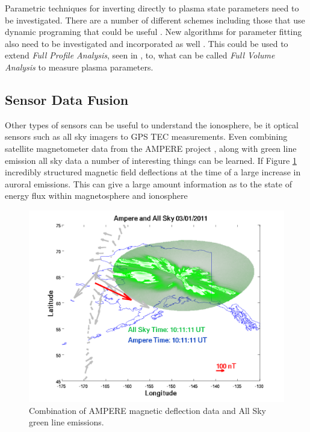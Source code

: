 Parametric techniques for inverting directly to plasma state parameters need to be investigated. There are a number of different schemes including those that use dynamic programing that could be useful \citep{Yau:1992kd,Yau:1993kf,Oktem:2014ju}. New algorithms for parameter fitting also need to be investigated and incorporated as well \citep{Shpynev:2010co}. This could be used to extend \textit{Full Profile Analysis}, seen in \citet{RDS:RDS3308,hysell2008}, to, what can be called \textit{Full Volume Analysis} to measure plasma parameters.

\subsection{Sensor Data Fusion}

Other types of sensors can be useful to understand the ionosphere, be it optical sensors such as all sky imagers to GPS TEC measurements. Even combining satellite magnetometer data from the AMPERE project \citep{Anderson:2000uh,Anderson:2014hf}, along with green line emission all sky data a number of interesting things can be learned. If Figure \ref{fig:swflow} incredibly structured magnetic field deflections at the time of a large increase in auroral emissions. This can give a large amount  information as to the state of energy flux within magnetosphere and ionosphere

\begin{figure}[h!]
\centering
\includegraphics[width=6.0in]{ampandallsky214}
\caption{Combination of AMPERE magnetic deflection data and All Sky green line emissions. }
\label{fig:swflow}
\end{figure}

